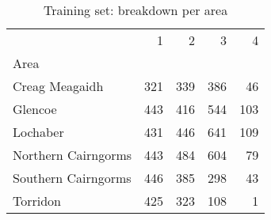\begin{table}[H]
\caption{Training set:  breakdown per area}
\label{tbl:sais_mapped_hazard_breakdown_per_area_train}
\begin{tabular}{lrrrr}
\toprule
 & 1 & 2 & 3 & 4 \\
Area &  &  &  &  \\
\midrule
Creag Meagaidh & 321 & 339 & 386 & 46 \\
Glencoe & 443 & 416 & 544 & 103 \\
Lochaber & 431 & 446 & 641 & 109 \\
Northern Cairngorms & 443 & 484 & 604 & 79 \\
Southern Cairngorms & 446 & 385 & 298 & 43 \\
Torridon & 425 & 323 & 108 & 1 \\
\bottomrule
\end{tabular}
\end{table}
